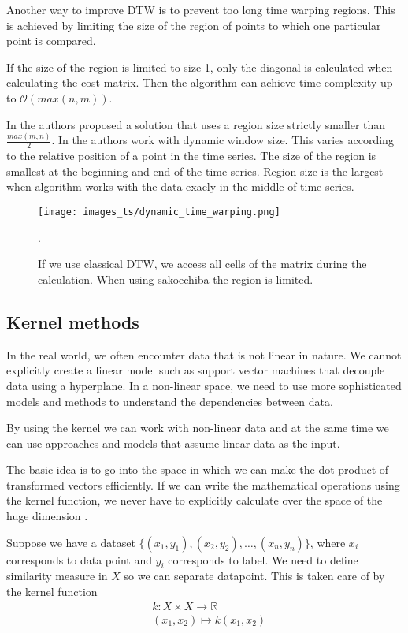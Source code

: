 \documentclass[thesis=M,english]{FITthesis}[2019/12/23]
\begin{document}
Another way to improve DTW is to prevent too long time warping regions. This is achieved by limiting the size of the region of points to which one particular point is compared. 

If the size of the region is limited to size 1, only the diagonal is calculated when calculating the cost matrix. Then the algorithm can achieve time complexity up to $\mathcal{O}(max(n,m))$.

In \cite{Sakoe_and_Chibu} the authors proposed a solution that uses a region size strictly smaller than $\frac{max(m,n)}{2}$. In \cite{Itakura} the authors work with dynamic window size. This varies according to the relative position of a point in the time series. The size of the region is smallest at the beginning and end of the time series. Region size is the largest when algorithm works with the data exacly in the middle of time series. 

\begin{figure}[ht!]
    \texttt{[image: images\_ts/dynamic\_time\_warping.png]}
    \caption{If we use classical DTW, we access all cells of the matrix during the calculation. When using sakoechiba the region is limited. \cite{DTW_optimization}}. 
    \label{fig:dynamic_time_warping}
    \centering
\end{figure}

\subsection{Kernel methods}
In the real world, we often encounter data that is not linear in nature. We cannot explicitly create a linear model such as support vector machines that decouple data using a hyperplane. In a non-linear space, we need to use more sophisticated models and methods to understand the dependencies between data.

By using the kernel we can work with non-linear data and at the same time we can use approaches and models that assume linear data as the input.

The basic idea is to go into the space in which we can make the dot product of transformed vectors efficiently. If we can write the mathematical operations using the kernel function, we never have to explicitly calculate over the space of the huge dimension \cite{kernel_theory}.

Suppose we have a dataset $\{{(x_1,y_1), (x_2,y_2),\dots,(x_n,y_n)}\}$, where $x_i$ corresponds to data point and $y_i$ corresponds to label.
We need to define similarity measure in $X$ so we can separate datapoint. This is taken care of by the kernel function
\begin{equation*}
\begin{split}
& k: X \times X \rightarrow \mathbb{R} \\
& (x_1, x_2) \mapsto k(x_1,x_2)
\end{split}
\end{equation*}
\end{document}
